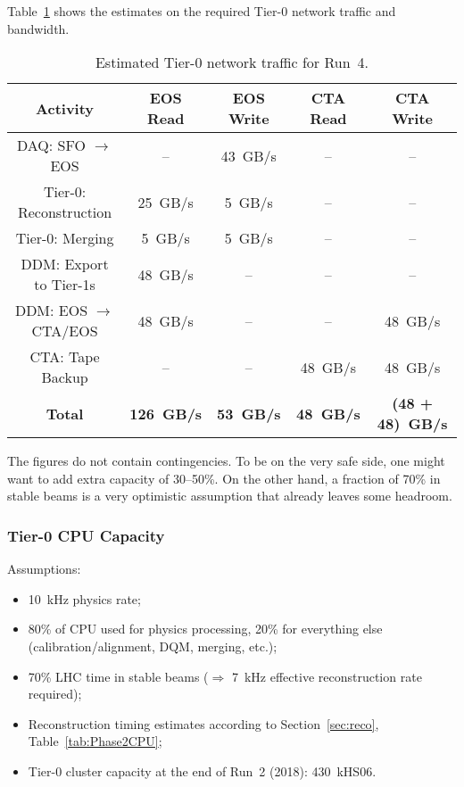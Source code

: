 Table~\ref{tab:tier0_rates} shows the estimates on the required Tier-0 network traffic and bandwidth.

\begin{table}[htb!]
\begin{center}
  \begin{tabular}{|c|c|c|c|c|}
    \hline
    {\bf Activity}                 & {\bf EOS Read}    & {\bf EOS Write}   & {\bf CTA Read} & {\bf CTA Write}      \\\hline\hline
    DAQ: SFO $\rightarrow$ EOS     & --                & 43~GB/s           & --             & --                   \\\hline
    Tier-0: Reconstruction         & 25~GB/s           & \phantom{4}5~GB/s & --             & --                   \\\hline
    Tier-0: Merging                & \phantom{4}5~GB/s & \phantom{4}5~GB/s & --             & --                   \\\hline
    DDM: Export to Tier-1s         & 48~GB/s           & --                & --             & --                   \\\hline
    DDM: EOS $\rightarrow$ CTA/EOS & 48~GB/s           & --                & --             & 48~GB/s              \\\hline
    CTA: Tape Backup               & --                & --                & 48~GB/s        & 48~GB/s              \\\hline\hline
    {\bf Total}                    & {\bf 126~GB/s}    & {\bf 53~GB/s}     & {\bf 48~GB/s}  & {\bf (48 + 48)~GB/s} \\\hline
  \end{tabular}
\end{center} 
\caption{Estimated Tier-0 network traffic for Run~4.}
\label{tab:tier0_rates}
\end{table}


The figures do not contain contingencies. To be on the very safe side, one might want to add extra capacity of 30--50\%. On the other hand, a fraction of 70\% in stable beams is a very optimistic assumption that already leaves some headroom.

\subsubsection{Tier-0 CPU Capacity}
\label{sec:tier0_capacity}

Assumptions: 

\begin{itemize}
  \item 10~kHz physics rate;
  \item 80\% of CPU used for physics processing, 20\% for everything else (calibration/alignment, DQM, merging, etc.);
  \item 70\% LHC time in stable beams ($\Rightarrow$ 7~kHz effective reconstruction rate required);
  \item Reconstruction timing estimates according to Section~\ref{sec:reco}, Table~\ref{tab:Phase2CPU}; 
\item Tier-0 cluster capacity at the end of Run~2 (2018): 430~kHS06.
\end{itemize}

